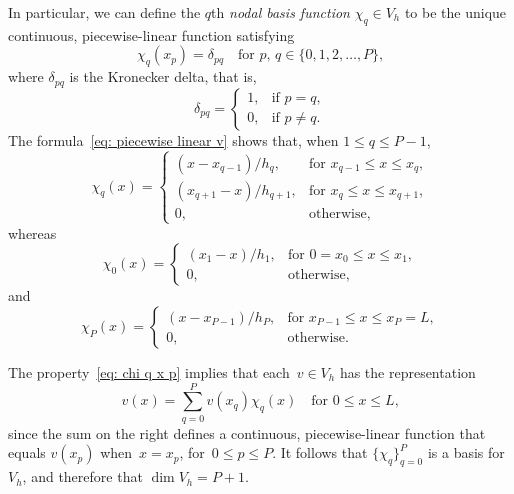 In particular, we can define the $q$th \emph{nodal basis function} 
$\chi_q\in V_h$ to be the unique continuous, piecewise-linear function 
satisfying
\begin{equation}\label{eq: chi q x p}
\chi_q(x_p)=\delta_{pq}\quad\text{for $p$, $q\in\{0, 1, 2, \ldots, P\}$,}
\end{equation}
where $\delta_{pq}$ is the Kronecker delta, that is,
\[
\delta_{pq}=\begin{cases}
1,&\text{if $p=q$,}\\ 0,&\text{if $p\ne q$.} 
\end{cases}
\]
The formula~\eqref{eq: piecewise linear v} shows that, when $1\le q\le P-1$,
\begin{equation}\label{eq: chi_q formula}
\chi_q(x)=\begin{cases}
	(x-x_{q-1})/h_q,&\text{for $x_{q-1}\le x\le x_q$,}\\
	(x_{q+1}-x)/h_{q+1},&\text{for $x_q\le x\le x_{q+1}$,}\\
	0,&\text{otherwise,}
\end{cases}
\end{equation}
whereas
\[
\chi_0(x)=\begin{cases}
	(x_1-x)/h_1,&\text{for $0=x_0\le x\le x_1$,}\\
	0,&\text{otherwise,}
\end{cases}
\]
and 
\[
\chi_P(x)=\begin{cases}
	(x-x_{P-1})/h_P,&\text{for $x_{P-1}\le x\le x_P=L$,}\\
	0,&\text{otherwise.}
\end{cases}
\]

The property~\eqref{eq: chi q x p} implies that each~$v\in V_h$ has the 
representation
\[
v(x)=\sum_{q=0}^P v(x_q)\chi_q(x)\quad\text{for $0\le x\le L$,}
\]
since the sum on the right defines a continuous, piecewise-linear function that 
equals $v(x_p)$ when~$x=x_p$, for~$0\le p\le P$.  It follows that 
$\{\chi_q\}_{q=0}^P$ is a basis for~$V_h$, and therefore that $\dim V_h=P+1$.


